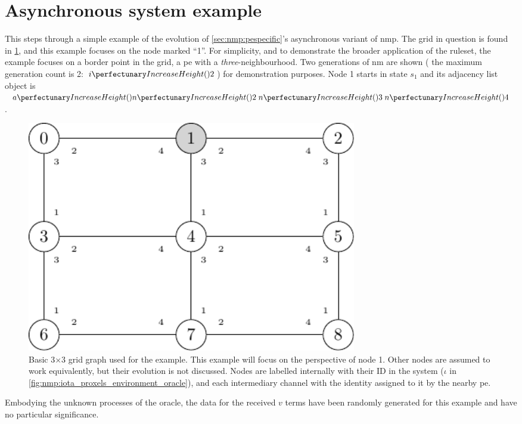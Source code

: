 \section{\label{sec:nmp:example}Asynchronous system example}
\newcommand*{\obinnod}[1]{Objects inside node 1 at the end of round #1}
\newcommand*{\obinrul}[2]{Objects inside node 1 after application of rule#1 during round #2}

This  steps through a simple example of the evolution of \cref{sec:nmp:pespecific}'s asynchronous variant of \gls{nmp}.  The grid in question is found in \cref{fig:nmp:basicgrid}, and this example focuses on the node marked ``1''.  For simplicity, and to demonstrate the broader application of the \gls{ruleset}, the example focuses on a border point in the grid, \ie{} a \gls{pe} with a \emph{three}-neighbourhood.  Two generations of \gls{nm} are shown (\ie{} the maximum generation count is 2: \(\cpfunc{i}{2}\)) for demonstration purposes.  Node 1 starts in state \(s_1\) and its adjacency list object is \(\cpfunc{a}{\cpfunc{n}{2} \; \cpfunc{n}{3} \;\cpfunc{n}{4}}\).

\begin{figure}
    \centering
    \includegraphics[keepaspectratio,width=0.7\textwidth,height=0.3\textheight]{chapters/nmp/images/3by3gridgraph.pdf}
    \caption[Basic 3×3 grid graph used for the example]{Basic 3×3 grid graph used for the example.  This example will focus on the perspective of node 1.  Other nodes are assumed to work equivalently, but their evolution is not discussed.  Nodes are labelled internally with their ID in the system (\(\iota\) in \cref{fig:nmp:iota_proxels_environment_oracle}), and each intermediary channel with the identity assigned to it by the nearby \gls{pe}.}
    \label{fig:nmp:basicgrid}
\end{figure}

Embodying the unknown processes of the oracle, the data for the received \(v\) terms have been randomly generated for this example and have no particular significance.

